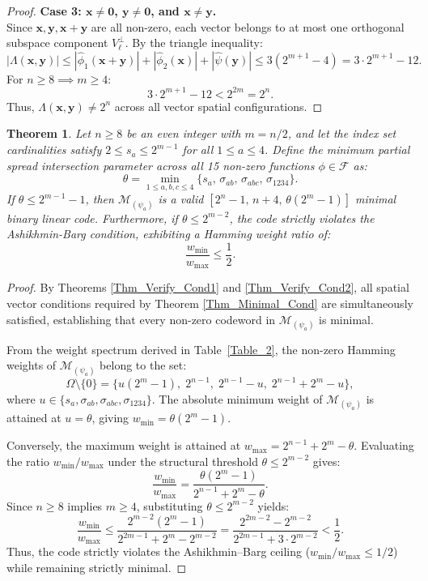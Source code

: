 \documentclass[10pt,a4paper]{amsart}
\newtheorem{theorem}{Theorem}%
\begin{document}
\begin{proof}
\textbf{Case 3: $\mathbf{x} \neq \mathbf{0}$, $\mathbf{y} \neq \mathbf{0}$, and $\mathbf{x} \neq \mathbf{y}$.} \\
Since $\mathbf{x}, \mathbf{y}, \mathbf{x}+\mathbf{y}$ are all non-zero, each vector belongs to at most one orthogonal subspace component $V_\ell^\perp$. By the triangle inequality:
\[
|\Lambda(\mathbf{x}, \mathbf{y})| \leq |\widehat{\phi}_1(\mathbf{x}+\mathbf{y})| + |\widehat{\phi}_2(\mathbf{x})| + |\widehat{\psi}(\mathbf{y})| \leq 3(2^{m+1} - 4) = 3 \cdot 2^{m+1} - 12.
\]
For $n \geq 8 \implies m \geq 4$:
\[
3 \cdot 2^{m+1} - 12 < 2^{2m} = 2^n.
\]
Thus, $\Lambda(\mathbf{x}, \mathbf{y}) \neq 2^n$ across all vector spatial configurations.
\end{proof}
\begin{theorem}\label{Thm_Main_Code_Result}
Let $n \ge 8$ be an even integer with $m = n/2$, and let the index set cardinalities satisfy $2 \le s_a \le 2^{m-1}$ for all $1 \le a \le 4$. Define the minimum partial spread intersection parameter across all 15 non-zero functions $\phi \in \mathcal{F}$ as:
\[
\theta = \min_{1 \le a,b,c \le 4} \{ s_a, \, \sigma_{ab}, \, \sigma_{abc}, \, \sigma_{1234} \}.
\]
If $\theta \le 2^{m-1} - 1$, then $\mathcal{M}_{(\psi_a)}$ is a valid $[2^n - 1, \, n + 4, \, \theta(2^m - 1)]$ minimal binary linear code. Furthermore, if $\theta \le 2^{m-2}$, the code strictly violates the Ashikhmin-Barg condition, exhibiting a Hamming weight ratio of:
\[
\frac{w_{\min}}{w_{\max}} \le \frac{1}{2}.
\]
\end{theorem}
\begin{proof}
By Theorems \ref{Thm_Verify_Cond1} and \ref{Thm_Verify_Cond2}, all spatial vector conditions required by Theorem \ref{Thm_Minimal_Cond} are simultaneously satisfied, establishing that every non-zero codeword in $\mathcal{M}_{(\psi_a)}$ is minimal.

From the weight spectrum derived in Table~\ref{Table_2}, the non-zero Hamming weights of $\mathcal{M}_{(\psi_a)}$ belong to the set:
\[
\Omega \setminus \{0\} = \{ u(2^m - 1), \; 2^{n-1}, \; 2^{n-1} - u, \; 2^{n-1} + 2^m - u \},
\]
where $u \in \{s_a, \sigma_{ab}, \sigma_{abc}, \sigma_{1234}\}$. The absolute minimum weight of $\mathcal{M}_{(\psi_a)}$ is attained at $u = \theta$, giving $w_{\min} = \theta(2^m - 1)$.

Conversely, the maximum weight is attained at $w_{\max} = 2^{n-1} + 2^m - \theta$. Evaluating the ratio $w_{\min} / w_{\max}$ under the structural threshold $\theta \le 2^{m-2}$ gives:
\[
\frac{w_{\min}}{w_{\max}} = \frac{\theta(2^m - 1)}{2^{n-1} + 2^m - \theta}.
\]
Since $n \ge 8$ implies $m \ge 4$, substituting $\theta \le 2^{m-2}$ yields:
\[
\frac{w_{\min}}{w_{\max}} \le \frac{2^{m-2}(2^m - 1)}{2^{2m-1} + 2^m - 2^{m-2}} = \frac{2^{2m-2} - 2^{m-2}}{2^{2m-1} + 3 \cdot 2^{m-2}} < \frac{1}{2}.
\]
Thus, the code strictly violates the Ashikhmin--Barg ceiling ($w_{\min} / w_{\max} \le 1/2$) while remaining strictly minimal.
\end{proof}
\end{document}
